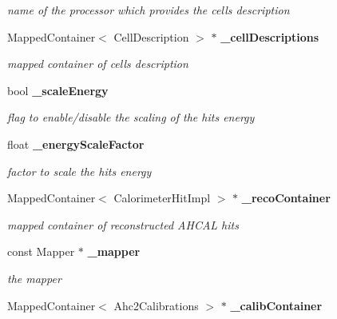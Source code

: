 \begin{DoxyCompactItemize}
\begin{DoxyCompactList}\small\item\em name of the processor which provides the cells description \item\end{DoxyCompactList}\item 
MappedContainer$<$ CellDescription $>$ $\ast$ {\bf \_\-cellDescriptions}\label{classCALICE_1_1Ahc2CalibrateProcessor_a9569a1acebd769a434928d339a069eb3}

\begin{DoxyCompactList}\small\item\em mapped container of cells description \item\end{DoxyCompactList}\item 
bool {\bf \_\-scaleEnergy}\label{classCALICE_1_1Ahc2CalibrateProcessor_aef2b11d192204ebb3723fb47fe6a0976}

\begin{DoxyCompactList}\small\item\em flag to enable/disable the scaling of the hits energy \item\end{DoxyCompactList}\item 
float {\bf \_\-energyScaleFactor}\label{classCALICE_1_1Ahc2CalibrateProcessor_af0d0eb5ee2782716f379aff4798f7d0f}

\begin{DoxyCompactList}\small\item\em factor to scale the hits energy \item\end{DoxyCompactList}\item 
MappedContainer$<$ CalorimeterHitImpl $>$ $\ast$ {\bf \_\-recoContainer}\label{classCALICE_1_1Ahc2CalibrateProcessor_a51ad92c817fd651000dec667467090b5}

\begin{DoxyCompactList}\small\item\em mapped container of reconstructed AHCAL hits \item\end{DoxyCompactList}\item 
const Mapper $\ast$ {\bf \_\-mapper}\label{classCALICE_1_1Ahc2CalibrateProcessor_a823161d30fc7caff787b92ea8f3fd728}

\begin{DoxyCompactList}\small\item\em the mapper \item\end{DoxyCompactList}\item 
MappedContainer$<$ Ahc2Calibrations $>$ $\ast$ {\bf \_\-calibContainer}\label{classCALICE_1_1Ahc2CalibrateProcessor_af32eea30839db78e5e5aa45c42dac715}


\end{DoxyCompactItemize}
